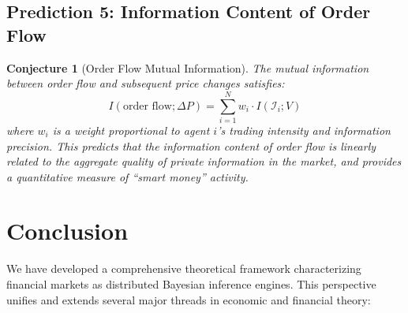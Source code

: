 \documentclass[12pt,a4paper]{article}
\newtheorem{conjecture}[theorem]{Conjecture}
\theoremstyle{definition}
\newcommand{\I}{\mathcal{I}}
\begin{document}
\subsection{Prediction 5: Information Content of Order Flow}

\begin{conjecture}[Order Flow Mutual Information]\label{conj:order_flow}
The mutual information between order flow and subsequent price changes satisfies:
\begin{equation}
    I(\text{order flow}; \Delta P) = \sum_{i=1}^{N} w_i \cdot I(\I_i; V)
\end{equation}
where $w_i$ is a weight proportional to agent $i$'s trading intensity and information precision. This predicts that the information content of order flow is linearly related to the aggregate quality of private information in the market, and provides a quantitative measure of ``smart money'' activity.
\end{conjecture}



\section{Conclusion}\label{sec:conclusion}

We have developed a comprehensive theoretical framework characterizing financial markets as distributed Bayesian inference engines. This perspective unifies and extends several major threads in economic and financial theory:
\end{document}
